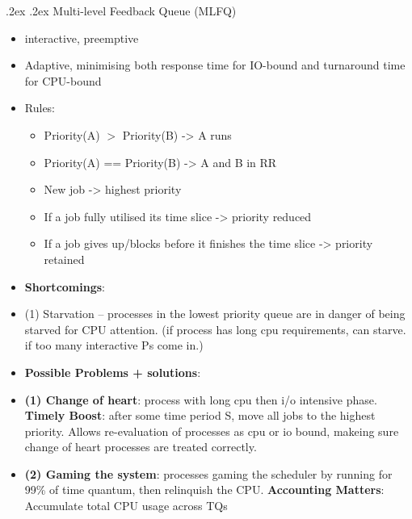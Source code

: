 \documentclass[10pt,landscape,a4paper]{article}
\makeatletter
\renewcommand{\subsubsection}{\@startsection{subsubsection}{1}{0mm}%
  {.2ex}%
  {.2ex}%
{\rmfamily\bfseries}}
\makeatother
\begin{document}
\begin{multicols*}{4}
  \subsubsection{Multi-level Feedback Queue (MLFQ)}
  \begin{itemize}
    \item interactive, preemptive
    \item Adaptive, minimising both response time for IO-bound and turnaround time for CPU-bound
    \item Rules:
    \begin{itemize}
      \item Priority(A) $>$ Priority(B) -> A runs
      \item Priority(A) == Priority(B) -> A and B in RR
      \item New job -> highest priority
      \item If a job fully utilised its time slice -> priority reduced
      \item If a job gives up/blocks before it finishes the time slice -> priority retained
    \end{itemize}
    \item \textbf{Shortcomings}: 
    \item (1) Starvation -- processes in the lowest priority queue are in danger of being starved for CPU attention. (if process has long cpu requirements, can starve. if too many interactive Ps come in.)
    \item \textbf{Possible Problems + solutions}:
    \item \textbf{(1) Change of heart}: process with long cpu then i/o intensive phase. \textbf{Timely Boost}: after some time period S, move all jobs to the highest priority. Allows re-evaluation of processes as cpu or io bound, makeing sure change of heart processes are treated correctly.
    \item \textbf{(2) Gaming the system}: processes gaming the scheduler by running for 99\% of time quantum, then relinquish the CPU. \textbf{Accounting Matters}: Accumulate total CPU usage across TQs
  \end{itemize}

\end{multicols*}
\end{document}
